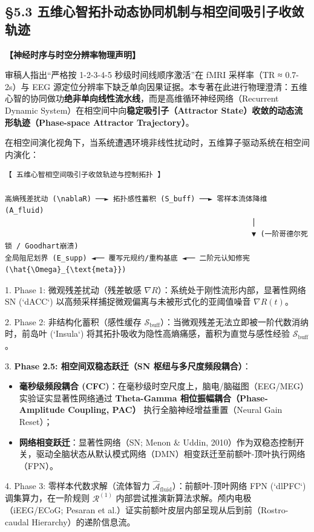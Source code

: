 \documentclass[11pt,a4paper,oneside]{ctexart}
\begin{document}
\subsection{§5.3 五维心智拓扑动态协同机制与相空间吸引子收敛轨迹}

\begin{notebox}
\textbf{【神经时序与时空分辨率物理声明】}

审稿人指出“严格按 1-2-3-4-5 秒级时间线顺序激活”在 fMRI 采样率（TR ≈ 0.7-2s）与 EEG 源定位分辨率下缺乏单向因果证据。本专著在此进行物理澄清：五维心智的协同做功\textbf{绝非单向线性流水线}，而是高维循环神经网络（Recurrent Dynamic System）在相空间中向\textbf{稳定吸引子（Attractor State）收敛的动态流形轨迹（Phase-space Attractor Trajectory）}。
\end{notebox}

在相空间演化视角下，当系统遭遇环境非线性扰动时，五维算子驱动系统在相空间内演化：


\begin{tcolorbox}[colback=gray!5!white,colframe=gray!50!black,fontupper=\ttfamily\small]
\begin{verbatim}
【 五维心智相空间吸引子收敛轨迹与控制拓扑 】

高熵残差扰动 (\nablaR) ──► 拓扑感性蓄积 (S_buff) ──► 零样本流体降维 (A_fluid)
                                                         │
                                                         ▼ (一阶哥德尔死锁 / Goodhart崩溃)
全局阻尼划界 (E_supp) ◄── 覆写元规约/重构基底 ◄── 二阶元认知修宪 (\hat{\Omega}_{\text{meta}})
\end{verbatim}
\end{tcolorbox}

1. \textit{}Phase 1: 微观残差扰动（残差敏感 $\nabla R$）\textit{}：系统处于刚性流形内部，显著性网络 SN (`dACC`) 以高频采样捕捉微观偏离与未被形式化的亚阈值噪音 $\nabla R(t)$。

2. \textit{}Phase 2: 非结构化蓄积（感性缓存 $\mathcal{S}_{\text{buff}}$）\textit{}：当微观残差无法立即被一阶代数消纳时，前岛叶 (`Insula`) 将其拓扑吸收为隐性高熵痛感，蓄积为直觉与感性经验 $\mathcal{S}_{\text{buff}}$。

3. \textbf{Phase 2.5: 相空间双稳态跃迁（SN 枢纽与多尺度频段耦合）}：

\begin{itemize}\item \textbf{毫秒级频段耦合 (CFC)}：在毫秒级时空尺度上，脑电/脑磁图（EEG/MEG）实验证实显著性网络通过 \textbf{Theta-Gamma 相位振幅耦合（Phase-Amplitude Coupling, PAC）} 执行全脑神经增益重置（Neural Gain Reset）；\end{itemize}
\begin{itemize}\item \textbf{网络相变跃迁}：显著性网络（SN; Menon \& Uddin, 2010）作为双稳态控制开关，驱动全脑状态从默认模式网络（DMN）相变跃迁至前额叶-顶叶执行网络（FPN）。\end{itemize}
4. \textit{}Phase 3: 零样本代数求解（流体智力 $\hat{\mathcal{A}}_{\text{fluid}}$）\textit{}：前额叶-顶叶网络 FPN (`dlPFC`) 调集算力，在一阶规则 $\mathcal{R}^{(1)}$ 内部尝试推演新算法求解。颅内电极（iEEG/ECoG; Pesaran et al.）证实前额叶皮层内部呈现从后到前（Rostro-caudal Hierarchy）的递阶信息流。
\end{document}
